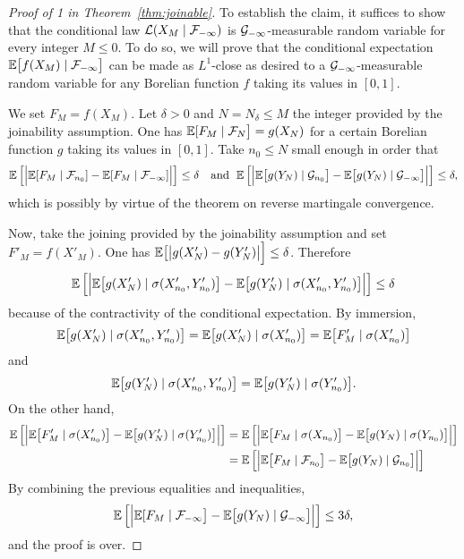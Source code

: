 \documentclass[12pt,a4paper]{article}
\begin{document}
\begin{proof}[Proof of 1 in Theorem~\ref{thm:joinable}]
To establish the claim, it suffices to show that 
the conditional law $\mathcal{L}(X_M \mid \mathcal{F}_{-\infty})$ is 
$\mathcal{G}_{-\infty}$-measurable random variable for every integer $M \leq 0$. 
To do so, we will prove that the conditional expectation 
$\mathbb{E}\bigl[f(X_{M}) \mid \mathcal{F}_{-\infty}\bigr]$ can be made as $L^1$-close as desired to a 
$\mathcal{G}_{-\infty}$-measurable random variable for any Borelian function $f$ 
taking its values in $[0,1]$. 

We set $F_M=f(X_M)$. Let $\delta>0$ and $N = N_\delta \leq M$ 
the integer provided by the joinability assumption. 
One has 
$\mathbb{E}[F_M \mid \mathcal{F}_{N}\bigr] = g(X_{N})$ 
for a certain Borelian function $g$ taking its values in $[0,1]$. 
Take $n_0 \leq N$ small enough in order that 
$$
\mathbb{E}\left[ \Bigr| 
\mathbb{E}[F_M \mid \mathcal{F}_{n_0}] - \mathbb{E}[F_M \mid \mathcal{F}_{-\infty}] 
\Bigl| \right] 
\leq \delta
\quad \text{and }\; 
\mathbb{E}\left[ \Bigr| 
\mathbb{E}\bigl[g(Y_N) \mid \mathcal{G}_{n_0}\bigr] - \mathbb{E}\bigl[g(Y_N) \mid \mathcal{G}_{-\infty}\bigr]
\Bigl| \right] 
\leq \delta,
$$
which is possibly by virtue of the theorem on reverse martingale convergence. 

Now, take the joining provided by the joinability assumption and set $F'_M=f(X'_M)$. 
One has $\mathbb{E}\bigl[\bigl|g(X'_N) - g(Y'_N)\bigr|\Bigr] \leq \delta$. Therefore 
$$
\mathbb{E}\left[ \Bigr|\mathbb{E}\bigl[g(X'_N) \mid \sigma(X'_{n_0}, Y'_{n_0})\bigr] 
 - \mathbb{E}\bigl[g(Y'_N) \mid \sigma(X'_{n_0}, Y'_{n_0}) \bigr] \Bigl| \right] \leq \delta
$$
because of the contractivity of the conditional expectation. 
By immersion, 
$$
\mathbb{E}\bigl[g(X'_N) \mid \sigma(X'_{n_0}, Y'_{n_0})\bigr] 
= \mathbb{E}\bigl[g(X'_N) \mid \sigma(X'_{n_0})\bigr] = \mathbb{E}\bigl[F'_M \mid \sigma(X'_{n_0})\bigr]
$$
and 
$$
\mathbb{E}\bigl[g(Y'_N) \mid \sigma(X'_{n_0}, Y'_{n_0})\bigr] 
= \mathbb{E}\bigl[g(Y'_N) \mid \sigma(Y'_{n_0})\bigr]. 
$$
On the other hand, 
\begin{align*}
\mathbb{E}\left[ \Bigr| 
\mathbb{E}\bigl[F'_M \mid \sigma(X'_{n_0})\bigr] 
 - \mathbb{E}\bigl[g(Y'_N) \mid \sigma(Y'_{n_0})\bigr] 
\Bigl| \right] 
& = \mathbb{E}\left[ \Bigr| 
\mathbb{E}\bigl[F_M \mid \sigma(X_{n_0})\bigr] 
 - \mathbb{E}\bigl[g(Y_N) \mid \sigma(Y_{n_0})\bigr] 
\Bigl| \right] \\
& = \mathbb{E}\left[ \Bigr| 
\mathbb{E}\bigl[F_M \mid \mathcal{F}_{n_0}\bigr] 
 - \mathbb{E}\bigl[g(Y_N) \mid \mathcal{G}_{n_0}\bigr] 
\Bigl| \right]
\end{align*}
By combining the previous equalities and inequalities, 
$$
\mathbb{E}\left[ \Bigr| 
\mathbb{E}[F_M \mid \mathcal{F}_{-\infty}\bigr]  -  \mathbb{E}\bigl[g(Y_N) \mid \mathcal{G}_{-\infty}\bigr]
\Bigl| \right] 
\leq 3\delta,
$$
and the proof is over.
\end{proof}
\end{document}
